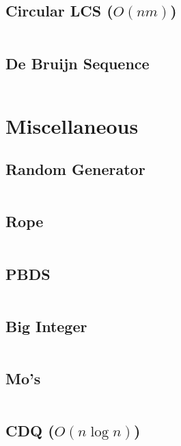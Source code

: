 \documentclass[8pt, a4paper, oneside]{extarticle}
\begin{document}
\begin{multicols*}{2}
\subsection{Circular LCS ($O(nm)$)}
\inputminted{c++}{codes/string/circular_lcs.cpp}
\subsection{De Bruijn Sequence}
\inputminted{c++}{codes/string/de_bruijn.cpp}

\section{Miscellaneous}
\subsection{Random Generator}
\inputminted{c++}{codes/miscellaneous/random_generator.cpp}

\subsection{Rope}
\inputminted{c++}{codes/miscellaneous/rope.cpp}

\subsection{PBDS}
\inputminted{c++}{codes/miscellaneous/pbds.cpp}

\subsection{Big Integer}
\inputminted{c++}{codes/miscellaneous/big_integer.cpp}

\subsection{Mo's}
\inputminted{c++}{codes/miscellaneous/mos.cpp}

\subsection{CDQ ($O(n \log n)$)}
\inputminted{c++}{codes/miscellaneous/cdq.cpp}



\end{multicols*}
\end{document}
